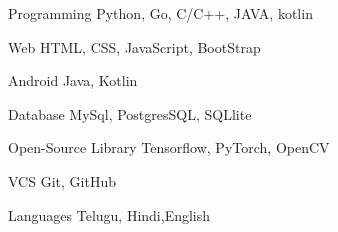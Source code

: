 

\begin{cvskills}

  \cvskill
    {Programming} %
    {Python, Go, C/C++, JAVA, kotlin} %

  \cvskill
    {Web} %
    {HTML, CSS, JavaScript, BootStrap} %


  \cvskill
    {Android} %
    {Java, Kotlin} %



  \cvskill
    {Database} %
    {MySql, PostgresSQL, SQLlite} %


  \cvskill
    {Open-Source Library} %
    {Tensorflow, PyTorch, OpenCV} %


  \cvskill
    {VCS} %
    {Git, GitHub} %
    
  \cvskill
    {Languages} %
    {Telugu, Hindi,English} %

\end{cvskills}
